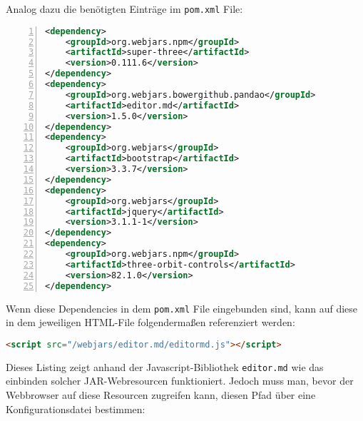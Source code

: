 \documentclass[paper=a4,12pt]{scrreprt}
\begin{document}
Analog dazu die benötigten Einträge im \texttt{pom.xml} File:\newline
\begin{lstlisting}[caption={Webjars - Javascript Libraries}, captionpos=b, label={listing:webjars_deps_js}, language=xml, numbers=left,
  stepnumber=1]
<dependency>
    <groupId>org.webjars.npm</groupId>
    <artifactId>super-three</artifactId>
    <version>0.111.6</version>
</dependency>
<dependency>
    <groupId>org.webjars.bowergithub.pandao</groupId>
    <artifactId>editor.md</artifactId>
    <version>1.5.0</version>
</dependency>
<dependency>
    <groupId>org.webjars</groupId>
    <artifactId>bootstrap</artifactId>
    <version>3.3.7</version>
</dependency>
<dependency>
    <groupId>org.webjars</groupId>
    <artifactId>jquery</artifactId>
    <version>3.1.1-1</version>
</dependency>
<dependency>
    <groupId>org.webjars.npm</groupId>
    <artifactId>three-orbit-controls</artifactId>
    <version>82.1.0</version>
</dependency>
\end{lstlisting}

Wenn diese Dependencies in dem \texttt{pom.xml} File eingebunden sind, kann auf diese in dem jeweiligen HTML-File folgendermaßen referenziert werden:\newline

\begin{lstlisting}[language=html]
<script src="/webjars/editor.md/editormd.js"></script>
\end{lstlisting}

Dieses Listing zeigt anhand der Javascript-Bibliothek \texttt{editor.md} wie das einbinden solcher JAR-Webresourcen funktioniert.\newline
Jedoch muss man, bevor der Webbrowser auf diese Resourcen zugreifen kann, diesen Pfad über eine Konfigurationsdatei bestimmen:\newline
\end{document}
